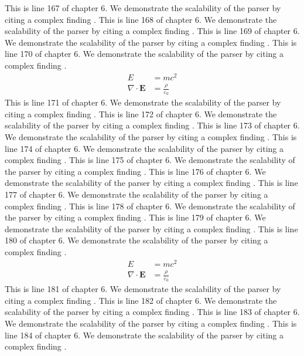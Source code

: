 This is line 167 of chapter 6. We demonstrate the scalability of the parser by citing a complex finding \cite{ref6_167}.
This is line 168 of chapter 6. We demonstrate the scalability of the parser by citing a complex finding \cite{ref6_168}.
This is line 169 of chapter 6. We demonstrate the scalability of the parser by citing a complex finding \cite{ref6_169}.
This is line 170 of chapter 6. We demonstrate the scalability of the parser by citing a complex finding \cite{ref6_170}.
\begin{align*}
  E &= mc^2 \\
  \nabla \cdot \mathbf{E} &= \frac{\rho}{\varepsilon_0}
\end{align*}
This is line 171 of chapter 6. We demonstrate the scalability of the parser by citing a complex finding \cite{ref6_171}.
This is line 172 of chapter 6. We demonstrate the scalability of the parser by citing a complex finding \cite{ref6_172}.
This is line 173 of chapter 6. We demonstrate the scalability of the parser by citing a complex finding \cite{ref6_173}.
This is line 174 of chapter 6. We demonstrate the scalability of the parser by citing a complex finding \cite{ref6_174}.
This is line 175 of chapter 6. We demonstrate the scalability of the parser by citing a complex finding \cite{ref6_175}.
This is line 176 of chapter 6. We demonstrate the scalability of the parser by citing a complex finding \cite{ref6_176}.
This is line 177 of chapter 6. We demonstrate the scalability of the parser by citing a complex finding \cite{ref6_177}.
This is line 178 of chapter 6. We demonstrate the scalability of the parser by citing a complex finding \cite{ref6_178}.
This is line 179 of chapter 6. We demonstrate the scalability of the parser by citing a complex finding \cite{ref6_179}.
This is line 180 of chapter 6. We demonstrate the scalability of the parser by citing a complex finding \cite{ref6_180}.
\begin{align*}
  E &= mc^2 \\
  \nabla \cdot \mathbf{E} &= \frac{\rho}{\varepsilon_0}
\end{align*}
This is line 181 of chapter 6. We demonstrate the scalability of the parser by citing a complex finding \cite{ref6_181}.
This is line 182 of chapter 6. We demonstrate the scalability of the parser by citing a complex finding \cite{ref6_182}.
This is line 183 of chapter 6. We demonstrate the scalability of the parser by citing a complex finding \cite{ref6_183}.
This is line 184 of chapter 6. We demonstrate the scalability of the parser by citing a complex finding \cite{ref6_184}.
